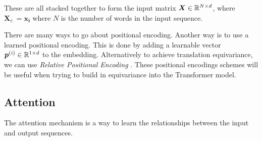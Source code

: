 \documentclass[../main.tex]{subfiles}
\begin{document}
\noi These are all stacked together to form the input matrix $\bm{X} \in \mathbb{R}^{N \times d}$, where $\bm{X}_{i:} = \bm{x_i}$ where $N$ is the number of words in the input sequence.

\begin{note}
	There are many ways to go about positional encoding. Another way is to use a learned positional encoding. This is done by adding a learnable vector $\bm{p}^{(i)} \in \mathbb{R}^{1 \times d}$ to the embedding. Alternatively to achieve translation equivariance, we can use \emph{Relative Positional Encoding} \cite{shaw2018selfattention, wu2021rethinking}. These positional encodings schemes will be useful when trying to build in equivariance into the Transformer model.
\end{note}


\subsection{Attention}

The attention mechanism is a way to learn the relationships between the input and output sequences. 


\end{document}
